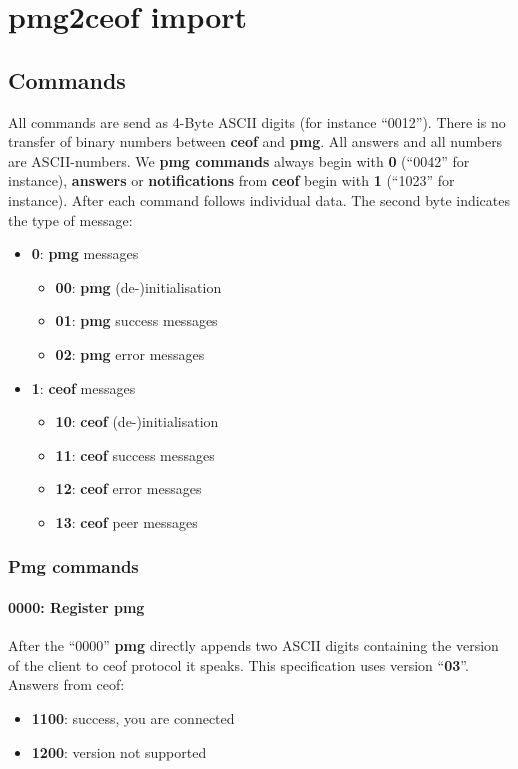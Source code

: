 \documentclass[12pt,a4paper]{book}
\begin{document}
\chapter{pmg2ceof import}
\section{Commands}
All commands are send as 4-Byte ASCII digits (for instance "`0012"').
There is no transfer of binary numbers between \textbf{ceof} and \textbf{pmg}.
All answers and all numbers are ASCII-numbers. We
\textbf{pmg commands} always begin with \textbf{0} ("`0042"' for instance),
\textbf{answers} or \textbf{notifications} from
\textbf{ceof} begin with \textbf{1} ("`1023"' for instance).
After each command follows individual data. The second byte indicates the type of message:
\begin{itemize}
\item \textbf{0}: \textbf{pmg} messages
\begin{itemize}
\item \textbf{00}: \textbf{pmg} (de-)initialisation
\item \textbf{01}: \textbf{pmg} success messages
\item \textbf{02}: \textbf{pmg} error messages
\end{itemize}
\item \textbf{1}: \textbf{ceof} messages
\begin{itemize}
\item \textbf{10}: \textbf{ceof} (de-)initialisation
\item \textbf{11}: \textbf{ceof} success messages
\item \textbf{12}: \textbf{ceof} error messages
\item \textbf{13}: \textbf{ceof} peer messages
\end{itemize}
\end{itemize}

\subsection{Pmg commands}
\subsubsection{0000: Register pmg}
After the "`0000"' \textbf{pmg} directly appends two ASCII digits containing the
version of the client to ceof protocol it speaks. This specification
uses version "`\textbf{03}"'.
Answers from ceof:
\begin{itemize}
\item \textbf{1100}: success, you are connected
\item \textbf{1200}: version not supported
\end{itemize}
\end{document}
